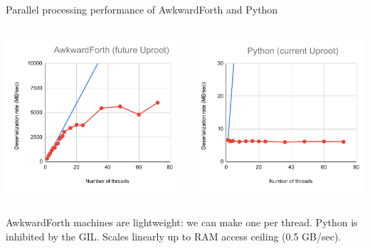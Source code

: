 \documentclass[aspectratio=169]{beamer}
\begin{document}
\begin{frame}{Parallel processing performance of AwkwardForth and Python}
\large
\vspace{0.2 cm}
\begin{columns}
\includegraphics[width=\linewidth]{AwkwardForth-scaling.pdf}

\includegraphics[width=\linewidth]{Python-scaling.pdf}
\end{columns}

AwkwardForth machines are lightweight: we can make one per thread. Python is inhibited by the GIL. Scales linearly up to RAM access ceiling (0.5 GB/sec).
\end{frame}
\end{document}
